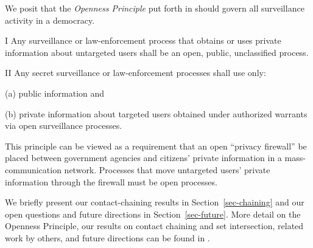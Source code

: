 We posit that the
{\it Openness Principle} put forth in \cite{sff-foci2014} 
should govern all surveillance activity in a democracy.
\begin{compactenum}
\item[I]
Any surveillance or law-enforcement process
that obtains or uses private information
about untargeted users shall be
an open, public, unclassified process.
\item[II]
Any secret surveillance or law-enforcement processes shall use only:
\begin{compactenum}
\item[(a)] public information and
\item[(b)] private information about targeted users obtained under 
authorized warrants via open surveillance processes.
\end{compactenum}
\end{compactenum}
This principle can be viewed as a requirement that an open
``privacy firewall'' be placed between government agencies and citizens'
private information in a mass-communication network.  Processes that move
untargeted users' private information through the firewall must be open
processes.  

We briefly present our contact-chaining results in 
Section~\ref{sec-chaining} and our open questions and future directions
in Section~\ref{sec-future}.  More detail on the Openness
Principle, our results on contact chaining and set intersection, related 
work by others, and future directions can be found in 
\cite{sff-TR,sff-foci2014}.
